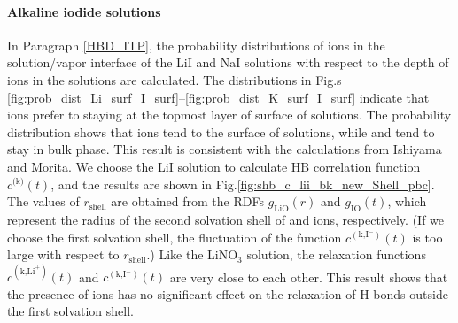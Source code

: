 \paragraph{Alkaline iodide solutions}
In Paragraph \ref{HBD_ITP}, the probability distributions of ions in the solution/vapor interface of the LiI and NaI solutions with respect to the depth 
of ions in the solutions %
are calculated. 
The distributions in Fig.s \ref{fig:prob_dist_Li_surf_I_surf}--\ref{fig:prob_dist_K_surf_I_surf} indicate
that \I ions prefer to staying at the topmost layer of surface of solutions.
The probability distribution shows that \I ions tend to the surface of solutions, while \Na and \Li tend to stay in bulk phase. 
This result is consistent with the calculations from Ishiyama and Morita\cite{TI07,Ishiyama2014}.
We choose the LiI solution to calculate HB correlation function $c^\text{(k)}(t)$,
and the results are shown in Fig.\ref{fig:shb_c_lii_bk_new_Shell_pbc}. The values of $r_\text{shell}$ are obtained from
the RDFs $g_\text{LiO}(r)$ and $g_\text{IO}(t)$, which represent the radius of the second solvation shell of \Li and \I ions, respectively. 
(If we choose the first solvation shell, the fluctuation of the function $c^{(\text{k,I}^-)}(t)$ is too large with respect to $r_{\text{shell}}$.) 
Like the LiNO$_3$ solution, the relaxation functions $c^{(\text{k,Li}^+)}(t)$ and 
$c^{(\text{k,I}^-)}(t)$ are very close to each other. 
This result shows that the presence of ions has no significant effect on the relaxation of H-bonds outside the first solvation shell.

